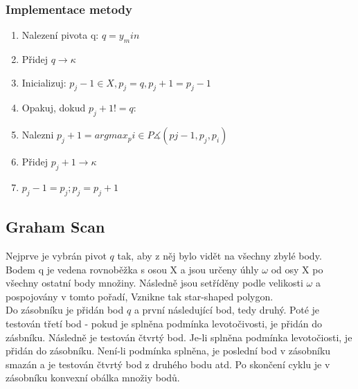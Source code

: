 \documentclass[a4paper, 12pt]{article}
\begin{document}
\subsubsection{Implementace metody}
\begin{enumerate}
\item Nalezení pivota q:  $ q = y_min $ 
\item Přidej $ q \longrightarrow \kappa $ 
\item Inicializuj: $p_j-1 \in X, p_j = q, p_j+1 = p_j-1$
\item Opakuj, dokud $p_j+1 != q: $
\item 	\hspace {1cm} Nalezni $p_j+1 = argmax_pi \in P \measuredangle (pj-1, p_j, p_i)$
\item 	\hspace {1cm} Přidej $p_j+1 \longrightarrow \kappa $
\item 	\hspace {1cm} $p_j-1 = p_j; p_j = p_j+1$

\end{enumerate}

\clearpage
\subsection{Graham Scan}
Nejprve je vybrán pivot $q$ tak, aby z něj bylo vidět na všechny zbylé body. Bodem q je vedena rovnoběžka s osou X a jsou určeny úhly $\omega$ od osy X po všechny ostatní body množiny. Následně jsou setříděny podle velikosti $\omega$ a pospojovány  v tomto pořadí, Vznikne tak star-shaped polygon.\\
Do zásobníku je přidán bod $q$ a první následující bod, tedy druhý. Poté je testován třetí bod - pokud je splněna podmínka levotočivosti, je přidán do zásbníku. Následně je testován čtvrtý bod. Je-li splněna podmínka levotočiosti, je přidán do zásobníku. Není-li podmínka splněna, je poslední bod v zásobníku smazán a je testován čtvrtý bod z druhého bodu atd. Po skončení cyklu je v zásobníku konvexní obálka množiy bodů.\\
\end{document}
